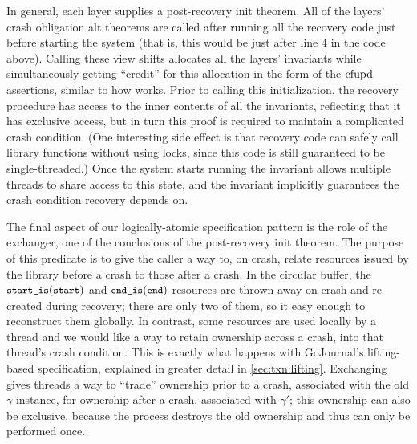 In general, each layer supplies a post-recovery init theorem. All of the layers' crash
obligation alt theorems are called after running all the recovery code just
before starting the system (that is, this would be just after line 4 in the
 code above). Calling these view shifts allocates all the layers'
invariants while simultaneously getting ``credit'' for this allocation in the
form of the $\mathrm{cfupd}$ assertions, similar to how  works.
Prior to calling this initialization, the recovery procedure has access to the
inner contents of all the invariants, reflecting that it has exclusive access,
but in turn this proof is required to maintain a complicated crash condition.
(One interesting side effect is that recovery code can safely call library
functions without using locks, since this code is still guaranteed to be
single-threaded.) Once the system starts running the invariant allows multiple
threads to share access to this state, and the invariant implicitly guarantees
the crash condition recovery depends on.

The final aspect of our logically-atomic specification pattern is the role of
the exchanger, one of the conclusions of the post-recovery init theorem. The
purpose of this predicate is to give the caller a way to, on crash, relate
resources issued by the library before a crash to those after a crash. In the
circular buffer, the $\startIs(\cc{start})$ and $\diskendIs(\cc{end})$ resources
are thrown away on crash and re-created during recovery; there are only two of
them, so it easy enough to reconstruct them globally. In contrast, some
resources are used locally by a thread and we would like a way to retain
ownership across a crash, into that thread's crash condition. This is exactly
what happens with GoJournal's lifting-based specification, explained in greater
detail in \cref{sec:txn:lifting}. Exchanging gives threads a way to ``trade''
ownership prior to a crash, associated with the old $\gamma$ instance, for
ownership after a crash, associated with $\gamma'$; this ownership can also be
exclusive, because the process destroys the old ownership and thus can only be
performed once.

